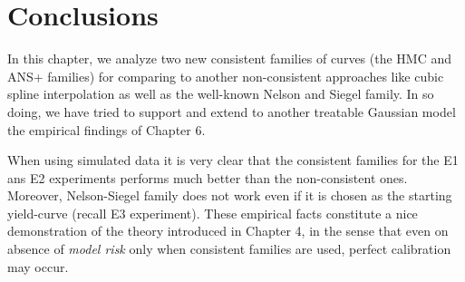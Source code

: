 %
\section{Conclusions}
In this chapter, we analyze two new consistent families of curves (the
HMC and ANS+ families) for comparing to another non-consistent approaches like
cubic spline interpolation as well as the well-known Nelson and Siegel family. In
so doing, we have tried to support and extend to another treatable
Gaussian model the empirical findings of Chapter 6.

When using simulated data it is very clear that the consistent
families for the E1 ans E2 experiments performs much better than the
non-consistent ones. Moreover, Nelson-Siegel family does not work even
if it is chosen as the starting yield-curve (recall E3
experiment). These empirical facts constitute a nice demonstration of
the theory introduced in Chapter 4, in the sense that even on absence
of {\sl model risk} only when consistent families are used, perfect
calibration may occur.

